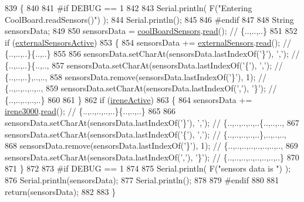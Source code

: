 \begin{DoxyCode}
839 \{
840 
841 \textcolor{preprocessor}{#if DEBUG == 1}
842 
843     Serial.println( F(\textcolor{stringliteral}{"Entering CoolBoard.readSensors()"}) );
844     Serial.println();
845 
846 \textcolor{preprocessor}{#endif}
847 
848     String sensorsData;
849 
850     sensorsData = \hyperlink{classCoolBoard_af102be5288bd7f7a8e59b13f86e26a00}{coolBoardSensors}.\hyperlink{classCoolBoardSensors_a91badb2539d91fda8679f2a597874c48}{read}(); \textcolor{comment}{// \{..,..,..\}}
851     
852     \textcolor{keywordflow}{if} (\hyperlink{classCoolBoard_a638b00b76aeb819ecfd4c10b8cdd7bb7}{externalSensorsActive})
853     \{
854         sensorsData += \hyperlink{classCoolBoard_a09e26264839c65873eb56af476eff6b2}{externalSensors}.\hyperlink{classExternalSensors_a53177b81eca3be89508b5511ddcd00fc}{read}(); \textcolor{comment}{// \{..,..,..\}\{..,..\}}
855 
856         sensorsData.setCharAt(sensorsData.lastIndexOf(\textcolor{charliteral}{'\}'}), \textcolor{charliteral}{','}); \textcolor{comment}{// \{..,..,..\}\{..,..,}
857         sensorsData.setCharAt(sensorsData.lastIndexOf(\textcolor{charliteral}{'\{'}), \textcolor{charliteral}{','}); \textcolor{comment}{// \{..,..,..\},..,..,}
858         sensorsData.remove(sensorsData.lastIndexOf(\textcolor{charliteral}{'\}'}), 1); \textcolor{comment}{// \{..,..,..,..,..,}
859         sensorsData.setCharAt(sensorsData.lastIndexOf(\textcolor{charliteral}{','}), \textcolor{charliteral}{'\}'}); \textcolor{comment}{// \{..,..,..,..,..\}}
860 
861     \}
862     \textcolor{keywordflow}{if} (\hyperlink{classCoolBoard_a9c3f7ac625481ee2ae802a25d97a4ae0}{ireneActive})
863     \{
864         sensorsData += \hyperlink{classCoolBoard_ad103718ce316006c4695b8eb312eaf11}{irene3000}.\hyperlink{classIrene3000_a852a170feea994ea1df01c6b245b5d9a}{read}(); \textcolor{comment}{// \{..,..,..,..,..\}\{..,..,..\}}
865 
866         sensorsData.setCharAt(sensorsData.lastIndexOf(\textcolor{charliteral}{'\}'}), \textcolor{charliteral}{','}); \textcolor{comment}{// \{..,..,..,..,..\{..,..,..,}
867         sensorsData.setCharAt(sensorsData.lastIndexOf(\textcolor{charliteral}{'\{'}), \textcolor{charliteral}{','}); \textcolor{comment}{// \{..,..,..,..,..\},..,..,..,}
868         sensorsData.remove(sensorsData.lastIndexOf(\textcolor{charliteral}{'\}'}), 1); \textcolor{comment}{// \{..,..,..,..,..,..,..,..,}
869         sensorsData.setCharAt(sensorsData.lastIndexOf(\textcolor{charliteral}{','}), \textcolor{charliteral}{'\}'}); \textcolor{comment}{// \{..,..,..,..,..,..,..,..\}}
870         
871     \}
872     
873 \textcolor{preprocessor}{#if DEBUG == 1}
874 
875     Serial.println( F(\textcolor{stringliteral}{"sensors data is "}) );
876     Serial.println(sensorsData);
877     Serial.println();
878 
879 \textcolor{preprocessor}{#endif}
880 
881     \textcolor{keywordflow}{return}(sensorsData);
882 
883 \}
\end{DoxyCode}
